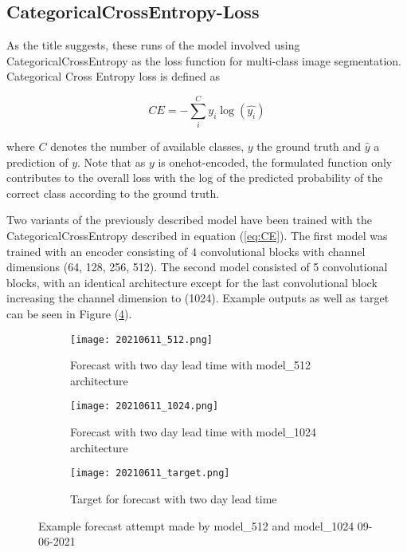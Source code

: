 \documentclass[../main/thesis]{subfiles}
\begin{document}
\subsection{CategoricalCrossEntropy-Loss}
As the title suggests, these runs of the model involved using CategoricalCrossEntropy as the loss function for multi-class image segmentation. Categorical Cross Entropy loss is defined as 

\begin{equation}
    \label{eq:CE}
    CE = - \sum_i^C y_i\log{(\hat{y_i})}
\end{equation}

where $C$ denotes the number of available classes, $y$ the ground truth and $\hat{y}$ a prediction of $y$. Note that as $y$ is onehot-encoded, the formulated function only contributes to the overall loss with the log of the predicted probability of the correct class according to the ground truth.

Two variants of the previously described model have been trained with the CategoricalCrossEntropy described in equation (\ref{eq:CE}). The first model was trained with an encoder consisting of 4 convolutional blocks with channel dimensions (64, 128, 256, 512). The second model consisted of 5 convolutional blocks, with an identical architecture except for the last convolutional block increasing the channel dimension to (1024). Example outputs as well as target can be seen in Figure (\ref{fig:20210611}).

\begin{figure}
    \begin{subfigure}{0.49\textwidth}
        \texttt{[image: 20210611\_512.png]}
        \caption{\label{fig:model51220210611}Forecast with two day lead time with model\_512 architecture}
    \end{subfigure}
    \hfill
    \begin{subfigure}{0.49\textwidth}
        \texttt{[image: 20210611\_1024.png]}
        \caption{\label{fig:model102420210611}Forecast with two day lead time with model\_1024 architecture}
    \end{subfigure}
    \begin{subfigure}{\textwidth}
        \texttt{[image: 20210611\_target.png]}
        \caption{\label{fig:target20210611}Target for forecast with two day lead time}
    \end{subfigure}
       \caption{\label{fig:20210611}Example forecast attempt made by model\_512 and model\_1024 09-06-2021}
\end{figure}
\end{document}
